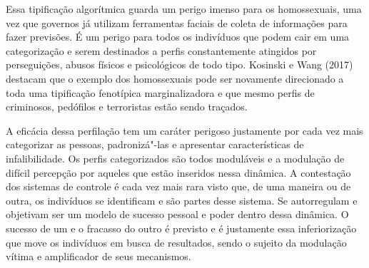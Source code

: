 Essa tipificação algorítmica guarda um perigo imenso para os
homossexuais, uma vez que governos já utilizam ferramentas faciais de
coleta de informações para fazer previsões. É um perigo para todos os
indivíduos que podem cair em uma categorização e serem destinados a
perfis constantemente atingidos por perseguições, abusos físicos e
psicológicos de todo tipo. Kosinski e Wang (2017) destacam que o exemplo
dos homossexuais pode ser novamente direcionado a toda uma tipificação
fenotípica marginalizadora e que mesmo perfis de criminosos, pedófilos e
terroristas estão sendo traçados.

A eficácia dessa perfilação tem um caráter perigoso justamente por cada
vez mais categorizar as pessoas, padronizá"-las e apresentar
características de infalibilidade. Os perfis categorizados são todos
moduláveis e a modulação de difícil percepção por aqueles que estão
inseridos nessa dinâmica. A contestação dos sistemas de controle é cada
vez mais rara visto que, de uma maneira ou de outra, os indivíduos se
identificam e são partes desse sistema. Se autorregulam e objetivam ser
um modelo de sucesso pessoal e poder dentro dessa dinâmica. O sucesso de
um e o fracasso do outro é previsto e é justamente essa inferiorização
que move os indivíduos em busca de resultados, sendo o sujeito da
modulação vítima e amplificador de seus mecanismos.


